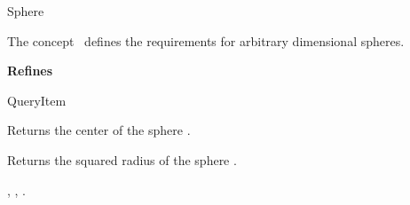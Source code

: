 

\begin{ccRefConcept}{Sphere}


\ccDefinition
  
The concept \ccRefName\ defines the requirements for arbitrary dimensional spheres.

{\bf Refines}

QueryItem


\ccTypes






\ccOperations

{Returns the center of the sphere \ccVar.}


{Returns the squared radius of the sphere \ccVar.}


\ccHasModels

, , 
.



\end{ccRefConcept}


